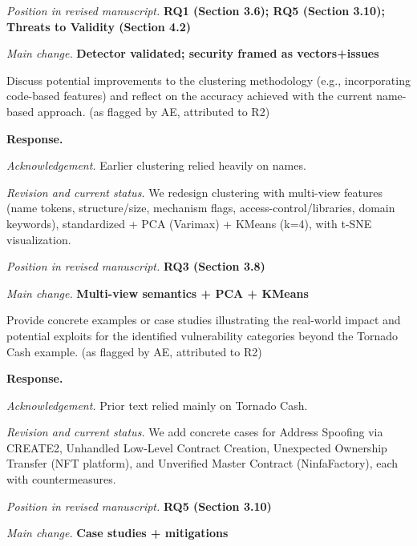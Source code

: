 \documentclass[acmsmall]{acmart}
\begin{document}
	\textit{Position in revised manuscript.}
	{\color{red}\textbf{RQ1 (Section 3.6); RQ5 (Section 3.10); Threats to Validity (Section 4.2)}}

	\textit{Main change.}
	{\color{blue}\textbf{Detector validated; security framed as vectors+issues}}

	\begin{tcolorbox}
		[commentbox,title=Reviewer \#2 -- Comment 2] Discuss potential improvements to the clustering
		methodology (e.g., incorporating code-based features) and reflect on the accuracy achieved with
		the current name-based approach. (as flagged by AE, attributed to R2)
	\end{tcolorbox}

	\noindent
	\textbf{Response.}

	\textit{Acknowledgement.} Earlier clustering relied heavily on names.

	\textit{Revision and current status.} We redesign clustering with multi-view features (name tokens,
	structure/size, mechanism flags, access-control/libraries, domain keywords), standardized + PCA (Varimax)
	+ KMeans (k=4), with t-SNE visualization.

	\textit{Position in revised manuscript.} {\color{red}\textbf{RQ3 (Section 3.8)}}

	\textit{Main change.} {\color{blue}\textbf{Multi-view semantics + PCA + KMeans}}

	\begin{tcolorbox}
		[commentbox,title=Reviewer \#2 -- Comment 3] Provide concrete examples or case studies illustrating
		the real-world impact and potential exploits for the identified vulnerability categories beyond
		the Tornado Cash example. (as flagged by AE, attributed to R2)
	\end{tcolorbox}

	\noindent
	\textbf{Response.}

	\textit{Acknowledgement.} Prior text relied mainly on Tornado Cash.

	\textit{Revision and current status.} We add concrete cases for Address Spoofing via CREATE2,
	Unhandled Low-Level Contract Creation, Unexpected Ownership Transfer (NFT platform), and
	Unverified Master Contract (NinfaFactory), each with countermeasures.

	\textit{Position in revised manuscript.} {\color{red}\textbf{RQ5 (Section 3.10)}}

	\textit{Main change.} {\color{blue}\textbf{Case studies + mitigations}}
\end{document}
